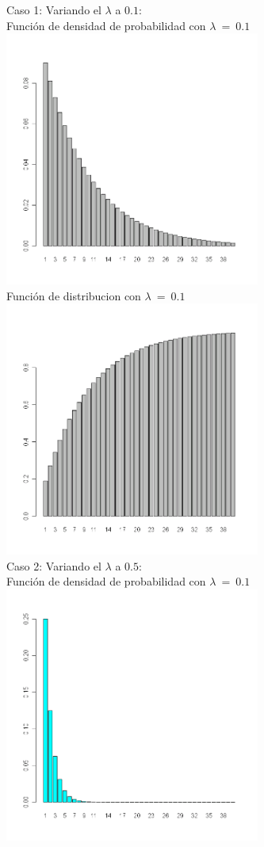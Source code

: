 \begin{itemize}
	Caso 1: Variando el $\lambda$ a $0.1$:\\
	Funci\'on de densidad de probabilidad con $\lambda\ =\ 0.1$\\
  	  \includegraphics[width=3.3in,height=3.3in]{images/1_2-dgeom01.png}\\
	Funci\'on de distribucion con $\lambda\ =\ 0.1$\\
  	  \includegraphics[width=3.3in,height=3.3in]{images/1_2-pgeom01.png}\\
	Caso 2: Variando el $\lambda$ a $0.5$:\\
	Funci\'on de densidad de probabilidad con $\lambda\ =\ 0.1$\\
  	  \includegraphics[width=3.3in,height=3.3in]{images/1_2-dgeom5.png}\\

\end{itemize}
